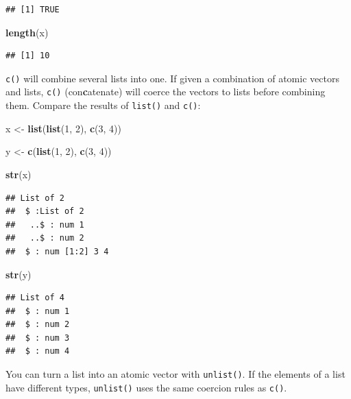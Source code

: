 \documentclass[
]{book}
\newenvironment{Shaded}{\begin{snugshade}}{\end{snugshade}}
\newcommand{\DecValTok}[1]{\textcolor[rgb]{0.00,0.00,0.81}{#1}}
\newcommand{\FunctionTok}[1]{\textcolor[rgb]{0.13,0.29,0.53}{\textbf{#1}}}
\newcommand{\NormalTok}[1]{#1}
\newcommand{\OtherTok}[1]{\textcolor[rgb]{0.56,0.35,0.01}{#1}}
\begin{document}
\begin{verbatim}
## [1] TRUE
\end{verbatim}

\begin{Shaded}
\begin{Highlighting}[]
\FunctionTok{length}\NormalTok{(x)}
\end{Highlighting}
\end{Shaded}

\begin{verbatim}
## [1] 10
\end{verbatim}

\texttt{c()} will combine several lists into one. If given a combination of atomic vectors and lists, \texttt{c()} (con\textbf{c}atenate) will coerce the vectors to lists before combining them. Compare the results of \texttt{list()} and \texttt{c()}:

\begin{Shaded}
\begin{Highlighting}[]
\NormalTok{x }\OtherTok{\textless{}{-}} \FunctionTok{list}\NormalTok{(}\FunctionTok{list}\NormalTok{(}\DecValTok{1}\NormalTok{, }\DecValTok{2}\NormalTok{), }\FunctionTok{c}\NormalTok{(}\DecValTok{3}\NormalTok{, }\DecValTok{4}\NormalTok{))}

\NormalTok{y }\OtherTok{\textless{}{-}} \FunctionTok{c}\NormalTok{(}\FunctionTok{list}\NormalTok{(}\DecValTok{1}\NormalTok{, }\DecValTok{2}\NormalTok{), }\FunctionTok{c}\NormalTok{(}\DecValTok{3}\NormalTok{, }\DecValTok{4}\NormalTok{))}

\FunctionTok{str}\NormalTok{(x)}
\end{Highlighting}
\end{Shaded}

\begin{verbatim}
## List of 2
##  $ :List of 2
##   ..$ : num 1
##   ..$ : num 2
##  $ : num [1:2] 3 4
\end{verbatim}

\begin{Shaded}
\begin{Highlighting}[]
\FunctionTok{str}\NormalTok{(y)}
\end{Highlighting}
\end{Shaded}

\begin{verbatim}
## List of 4
##  $ : num 1
##  $ : num 2
##  $ : num 3
##  $ : num 4
\end{verbatim}

You can turn a list into an atomic vector with \texttt{unlist()}. If the elements of a list have different types, \texttt{unlist()} uses the same coercion rules as \texttt{c()}.
\end{document}
